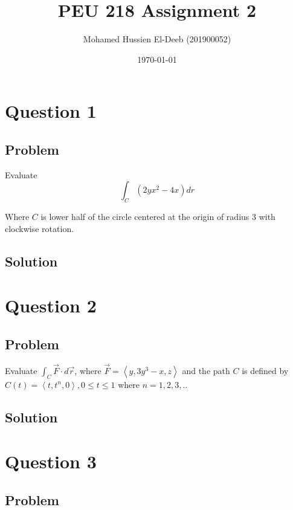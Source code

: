 \documentclass[12pt]{article}
\title{PEU 218 Assignment 2}
\author{Mohamed Hussien El-Deeb (201900052)}
\date{\today}
\begin{document}
\maketitle
\tableofcontents
\hypersetup{linkcolor=RoyalBlue4}

\newpage
\section{Question 1}

\subsection{Problem}

Evaluate
\[
    \int_C \left(2y x^2 - 4x\right) d r
\]

Where \(C\) is lower half of the circle centered at the origin of radius 3 with clockwise
rotation.

\subsection{Solution}



\newpage
\section{Question 2}

\subsection{Problem}

Evaluate \(\int_C \vec{F} \cdot d \vec{r}\), where
\(\vec{F}=\left\langle y, 3y^3 - x, z\right\rangle \) and the path \(C\) is defined by
\(C(t) = \left\langle t, t^n, 0\right\rangle, 0 \leq t \leq 1\) where \(n = 1, 2, 3, .. \)

\subsection{Solution}



\newpage
\section{Question 3}

\subsection{Problem}
\end{document}
